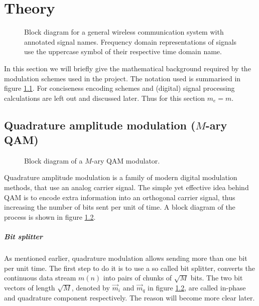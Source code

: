 
\chapter{Theory}

\begin{figure}
	\centering
	
	\caption{
		Block diagram for a general wireless communication system with annotated signal names. Frequency domain representations of signals use the uppercase symbol of their respective time domain name.
		\label{fig:notation}
	}
\end{figure}

In this section we will briefly give the mathematical background required by the modulation schemes used in the project. The notation used is summarised in figure \ref{fig:notation}. For conciseness encoding schemes and (digital) signal processing calculations are left out and discussed later. Thus for this section \(m_e = m\).


\section{Quadrature amplitude modulation (\(M\)-ary QAM)}

\begin{figure}
	\centering
	
	\caption{
		Block diagram of a \(M\)-ary QAM modulator.
		\label{fig:quadrature-modulation}
	}
\end{figure}

Quadrature amplitude modulation is a family of modern digital modulation methods, that use an analog carrier signal. The simple yet effective idea behind QAM is to encode extra information into an orthogonal carrier signal, thus increasing the number of bits sent per unit of time. A block diagram of the process is shown in figure \ref{fig:quadrature-modulation}.


\paragraph{Bit splitter}

As mentioned earlier, quadrature modulation allows sending more than one bit per unit time. The first step to do it is to use a so called bit splitter, converts the continuous data stream \(m(n)\) into pairs of chunks of \(\sqrt{M}\) bits. The two bit vectors of length \(\sqrt{M}\), denoted by \(\vec{m}_i\) and \(\vec{m}_q\) in figure \ref{fig:quadrature-modulation}, are called in-phase and quadrature component respectively. The reason will become more clear later.


